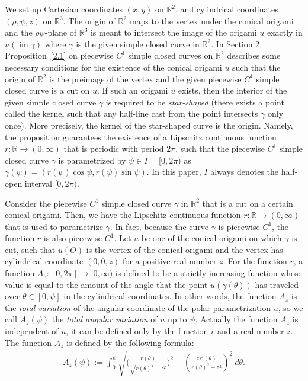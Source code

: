 \documentclass{amsart}
\theoremstyle{plain}
\theoremstyle{definition}
\theoremstyle{remark}
\DeclareMathOperator{\im}{im}
\begin{document}
We set up Cartesian coordinates $(x,y)$ on $\mathbb{R}^2$, and cylindrical coordinates $(\rho,\psi,z)$ on $\mathbb{R}^3$.
The origin of $\mathbb{R}^2$ maps to the vertex under the conical origami 
and the $\rho\psi$-plane of $\mathbb{R}^3$ is meant to intersect the image of the origami $u$ 
exactly in $u(\im\gamma)$ where $\gamma$ is the given simple closed curve in $\mathbb{R}^2$.
In Section 2, Proposition~\ref{2.1} 
on piecewise $C^1$ simple closed curves on $\mathbb{R}^2$
describes some necessary conditions for the existence of the conical origami $u$ 
such that the origin of $\mathbb{R}^2$ is the preimage of the vertex and the given piecewise $C^1$ simple closed curve is a cut on $u$.
If such an origami $u$ exists, then the interior of the given simple closed curve $\gamma$ is required to be \emph{star-shaped} 
(there exists a point called the kernel such that any half-line cast from the point intersects $\gamma$ only once).
More precisely, the kernel of the star-shaped curve is the origin.
Namely, the proposition guarantees the existence of a Lipschitz continuous function $r \colon \mathbb{R}\to(0,\infty)$ 
that is periodic with period $2\pi$, such that the piecewise $C^1$ simple closed curve $\gamma$ is parametrized by $\psi\in I=[0,2\pi)$ as $\gamma(\psi)=(r(\psi)\cos\psi,r(\psi)\sin\psi)$.
In this paper, $I$ always denotes the half-open interval $[0,2\pi)$.

Consider the piecewise $C^1$ simple closed curve $\gamma$ in $\mathbb{R}^2$ that is a cut on a certain conical origami.
Then, we have the Lipschitz continuous function $r \colon \mathbb{R}\to(0,\infty)$ that is used to parametrize $\gamma$.
In fact, because the curve $\gamma$ is piecewise $C^1$, the function $r$ is also piecewise $C^1$.
Let $u$ be one of the conical origami on which $\gamma$ is cut, such that $u(O)$ is the vertex of the conical origami and the vertex has cylindrical coordinate $(0,0,z)$ for a positive real number $z$.
For the function $r$, a function $A_z \colon [0,2\pi]\to[0,\infty)$ is defined to be a strictly 
increasing function whose value is equal to the amount of the angle that the point $u(\gamma(\theta))$ has traveled over $\theta\in[0,\psi]$ in the cylindrical coordinates.
In other words, the function $A_z$ is the \emph{total variation} of the angular coordinate of the polar parametrization $u$, so we call $A_z(\psi)$ the \emph{total angular variation} of $u$ up to $\psi$.
Actually the function $A_z$ is independent of $u$, it can be defined only by the function $r$ and a real number $z$.
The function $A_z$ is defined by the following formula: %
\begin{align*}
A_z(\psi):=\int_0^{\psi}\sqrt{\biggl(\frac{r(\theta)}{\sqrt{r(\theta)^2-z^2}}\biggr)^2-\left(\frac{zr'(\theta)}{r(\theta)^2-z^2}\right)^2}\,d\theta.
\end{align*}
\end{document}
